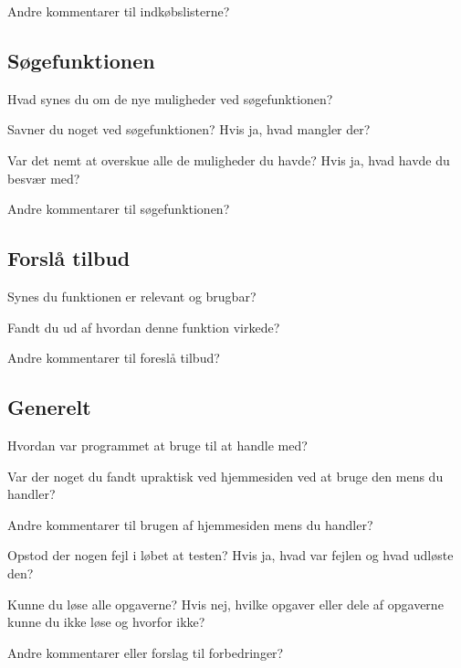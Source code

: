 Andre kommentarer til indkøbslisterne?

\subsection*{Søgefunktionen}
Hvad synes du om de nye muligheder ved søgefunktionen?

Savner du noget ved søgefunktionen? Hvis ja, hvad mangler der?

Var det nemt at overskue alle de muligheder du havde? Hvis ja, hvad havde du besvær med?

Andre kommentarer til søgefunktionen?

\subsection*{Forslå tilbud}
Synes du funktionen er relevant og brugbar?

Fandt du ud af hvordan denne funktion virkede?

Andre kommentarer til foreslå tilbud?

\subsection*{Generelt}
Hvordan var programmet at bruge til at handle med?

Var der noget du fandt upraktisk ved hjemmesiden ved at bruge den mens du handler?

Andre kommentarer til brugen af hjemmesiden mens du handler?

Opstod der nogen fejl i løbet at testen? Hvis ja, hvad var fejlen og hvad udløste den?

Kunne du løse alle opgaverne? Hvis nej, hvilke opgaver eller dele af opgaverne kunne du ikke løse og hvorfor ikke?

Andre kommentarer eller forslag til forbedringer?